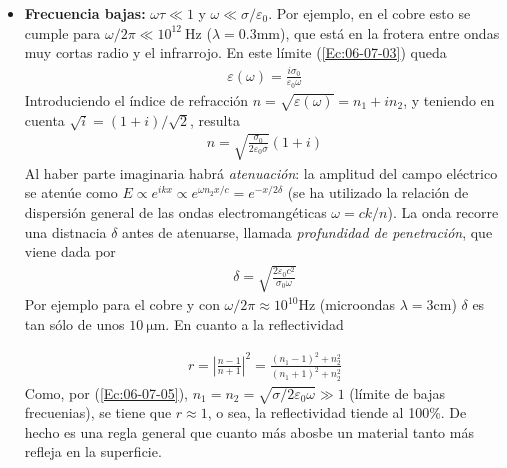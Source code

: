 \begin{itemize}
	\item \textbf{Frecuencia bajas:} $\omega \tau \ll 1$ y $\omega \ll \sigma / \varepsilon_0$. Por ejemplo, en el cobre esto se cumple para $\omega/2\pi\ll 10^{12} \ \unit{\Hz}$ ($\lambda = 0.3\unit{\mm}$), que está en la frotera entre ondas muy cortas radio y el infrarrojo. En este límite (\ref{Ec:06-07-03}) queda 
	\begin{eqnarray}
		\varepsilon(\omega) = \frac{i\sigma_0}{\varepsilon_0 \omega}
	\end{eqnarray}
	Introduciendo el índice de refracción $n=\sqrt{\varepsilon(\omega)}=n_1 + i n_2$, y teniendo en cuenta $\sqrt{i}=(1+i)/\sqrt{2}$, resulta
	\begin{eqnarray}
		n = \sqrt{\frac{\sigma_0}{2\varepsilon_0\sigma}} (1+i) \label{Ec:06-07-05}
	\end{eqnarray}
	Al haber parte imaginaria habrá \textit{atenuación}: la amplitud del campo eléctrico se atenúe como $E\propto e^{ikx} \propto e^{\omega n_2 x/c} = e^{-x/2\delta}$ (se ha utilizado la relación de dispersión general de las ondas electromangéticas $\omega = ck /n$). La onda recorre una distnacia $\delta$ antes de atenuarse, llamada \textit{profundidad de penetración}, que viene dada por 
	\begin{eqnarray}
		\delta = \sqrt{\frac{2\varepsilon_0 c^2}{\sigma_0 \omega}}
	\end{eqnarray}
	Por ejemplo para el cobre y con $\omega/2\pi \approx 10^{10} \unit{\Hz}$ (microondas $\lambda=3\unit{\cm}$) $\delta$ es tan sólo de unos $10 \ \unit{\um}$. En cuanto a la reflectividad 

	\begin{eqnarray}
		r = \left| \frac{n-1}{n+1} \right|^2 = \frac{(n_1-1)^2 + n_2^2}{(n_1+1)^2+n_2^2} \label{Ec:06-07-07}
	\end{eqnarray}
	Como, por (\ref{Ec:06-07-05}), $n_1 = n_2 = \sqrt{\sigma / 2\varepsilon_0 \omega} \gg 1$ (límite de bajas frecuenias), se tiene que $r\approx 1$, o sea, la reflectividad tiende al 100\%. De hecho es una regla general que cuanto más abosbe un material tanto más refleja en la superficie.


\end{itemize}
